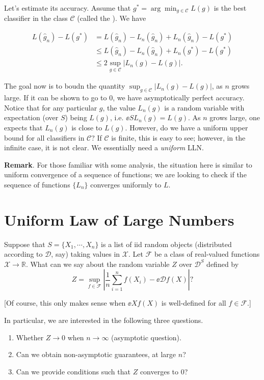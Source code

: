 Let's estimate its accuracy. Assume that $\displaystyle{g^* = \arg\min_{g\in\mathcal C}L(g)}$ is the best classifier in the class $\mathcal C$ (called the ). We have

\begin{align*}
    L(\widehat{g}_n) - L(g^*) &= L(\widehat{g}_n) - L_n(\widehat{g}_n) + L_n(\widehat{g}_n) - L(g^*)\\
    &\leq L(\widehat{g}_n) - L_n(\widehat{g}_n) + L_n(g^*) - L(g^*)\\
    &\leq 2\sup_{g\in \mathcal C}|L_n(g) - L(g)|.
\end{align*}

The goal now is to boudn the quantity $\sup_{g\in \mathcal C}|L_n(g) - L(g)|$, as $n$ grows large. If it can be shown to go to $0$, we have asymptotically perfect accuracy. Notice that for any particular $g$, the value $L_n(g)$ is a random variable with expectation (over $S$) being $L(g)$, i.e. $\ee{S}{L_n(g)} = L(g)$. As $n$ grows large, one expects that $L_n(g)$ is close to $L(g)$. However, do we have a uniform upper bound for all classifiers in $\mathcal C$? If $\mathcal C$ is finite, this is easy to see; however, in the infinite case, it is not clear. We essentially need a \emph{uniform} LLN.

\textbf{Remark}. For those familiar with some analysis, the situation here is similar to uniform convergence of a sequence of functions; we are looking to check if the sequence of functions $\{L_n\}$ converges uniformly to $L$.

\section{Uniform Law of Large Numbers}

Suppose that $S = \{X_1, \cdots, X_n\}$ is a list of iid random objects (distributed according to $\mathcal D$, say) taking values in $\mathcal X$. Let $\mathcal F$ be a class of real-valued functions $\mathcal X\to\mathbb R$. What can we say about the random variable $Z$ over $\mathcal D^S$ defined by
\[
    Z = \sup_{f\in\mathcal F} \left| \frac{1}{n} \sum_{i=1}^n f(X_i) - \ee{\mathcal D}{f(X)} \right|?
\]

[Of course, this only makes sense when $\ee{X}{f(X)}$ is well-defined for all $f\in\mathcal F$.]

In particular, we are interested in the following three questions.

\begin{enumerate}
    \item Whether $Z \to 0$ when $n\to\infty$ (asymptotic question).
    \item Can we obtain non-asymptotic guarantees, at large $n$?
    \item Can we provide conditions such that $Z$ converges to $0$?
\end{enumerate}

